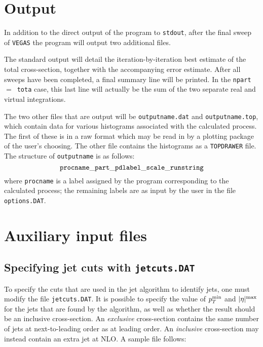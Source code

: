 \documentclass[12pt]{article}
\begin{document}
\section{Output}
 
In addition to the direct output of the program to {\tt stdout}, after
the final sweep of {\tt VEGAS} the program will output two additional files.

The standard output will detail the iteration-by-iteration best estimate
of the total cross-section, together with the accompanying error estimate.
After all sweeps have been completed, a final summary line will be printed.
In the {\tt npart}~$=$~{\tt tota} case, this last line will actually be the
sum of the two separate real and virtual integrations.

The two other files that are output will be {\tt outputname.dat} and
{\tt outputname.top}, which contain data for various histograms associated
with the calculated process. The first of these is in a raw format 
which may be read in by a plotting package of the user's choosing. The
other file contains the histograms as a {\tt TOPDRAWER} file. The structure
of {\tt outputname} is as follows:
\begin{displaymath}
{\tt procname\_part\_pdlabel\_scale\_runstring}
\end{displaymath}
where {\tt procname} is a label assigned by the program corresponding to
the calculated process; the remaining labels are as input by the user
in the file {\tt options.DAT}.

\section{Auxiliary input files}

\subsection{Specifying jet cuts with {\tt jetcuts.DAT}}

To specify the cuts that are used in the jet algorithm to identify
jets, one must modify the file {\tt jetcuts.DAT}. It is possible
to specify the value of $p_T^{\rm min}$ and $|\eta|^{\rm max}$ for the
jets that are found by the algorithm, as well as whether the
result should be an inclusive cross-section. An {\em exclusive}
cross-section contains the same number of jets at next-to-leading
order as at leading order. An {\em inclusive} cross-section may
instead contain an extra jet at NLO.
 A sample file follows:
\end{document}

